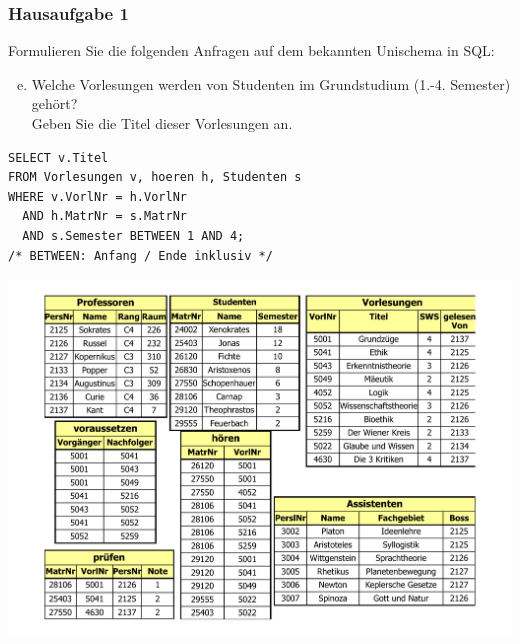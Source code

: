 \begin{frame}[fragile]
	\frametitle{Hausaufgabe 1}
	\vspace{0.25cm}

	\begin{multicols}{2}
		Formulieren Sie die folgenden Anfragen auf dem bekannten Unischema in SQL:
		\begin{enumerate}[a)]
			\setcounter{enumi}{4}
			\item Welche Vorlesungen werden von Studenten im Grundstudium (1.-4. Semester) gehört? \\
			      Geben Sie die Titel dieser Vorlesungen an.
		\end{enumerate}
		\begin{verbatim}
SELECT v.Titel
FROM Vorlesungen v, hoeren h, Studenten s
WHERE v.VorlNr = h.VorlNr
  AND h.MatrNr = s.MatrNr
  AND s.Semester BETWEEN 1 AND 4;
/* BETWEEN: Anfang / Ende inklusiv */
		\end{verbatim}
		\vfill\columnbreak

		\begin{center}
			\includegraphics[height=.6\paperheight]{../img/uni.pdf}
		\end{center}
	\end{multicols}
\end{frame}

